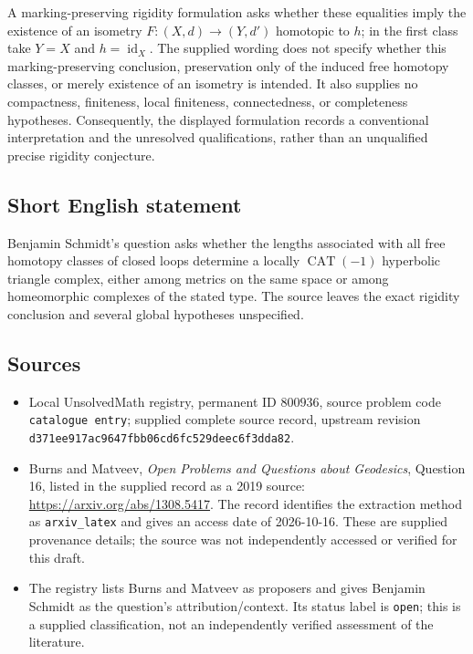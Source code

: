 \documentclass[11pt]{article}
\begin{document}
A marking-preserving rigidity formulation asks whether these equalities imply the existence of an isometry \(F\colon(X,d)\to(Y,d')\) homotopic to \(h\); in the first class take \(Y=X\) and \(h=\operatorname{id}_X\). The supplied wording does not specify whether this marking-preserving conclusion, preservation only of the induced free homotopy classes, or merely existence of an isometry is intended. It also supplies no compactness, finiteness, local finiteness, connectedness, or completeness hypotheses. Consequently, the displayed formulation records a conventional interpretation and the unresolved qualifications, rather than an unqualified precise rigidity conjecture.
\subsection{Short English statement}
Benjamin Schmidt's question asks whether the lengths associated with all free homotopy classes of closed loops determine a locally \(\operatorname{CAT}(-1)\) hyperbolic triangle complex, either among metrics on the same space or among homeomorphic complexes of the stated type. The source leaves the exact rigidity conclusion and several global hypotheses unspecified.
\subsection{Sources}
\begin{itemize}
\item Local UnsolvedMath registry, permanent ID \(800936\), source problem code \texttt{catalogue entry}; supplied complete source record, upstream revision \texttt{d371ee917ac9647fbb06cd6fc529deec6f3dda82}.
\item Burns and Matveev, \emph{Open Problems and Questions about Geodesics}, Question 16, listed in the supplied record as a 2019 source: \url{https://arxiv.org/abs/1308.5417}. The record identifies the extraction method as \texttt{arxiv\_latex} and gives an access date of 2026-10-16. These are supplied provenance details; the source was not independently accessed or verified for this draft.
\item The registry lists Burns and Matveev as proposers and gives Benjamin Schmidt as the question's attribution/context. Its status label is \texttt{open}; this is a supplied classification, not an independently verified assessment of the literature.
\end{itemize}
\end{document}
